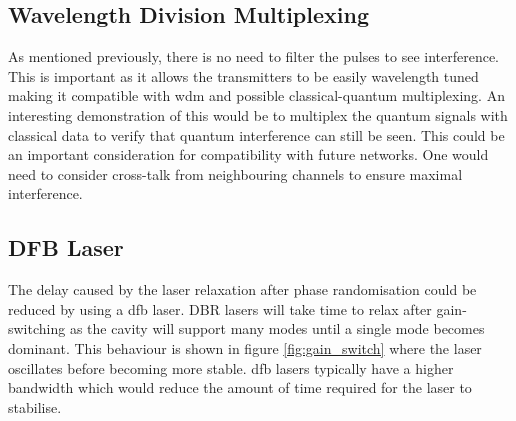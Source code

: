 \subsection{Wavelength Division Multiplexing}

As mentioned previously, there is no need to filter the pulses to see interference. This is important as it allows the transmitters to be easily wavelength tuned making it compatible with \ac{wdm} and possible classical-quantum multiplexing. An interesting demonstration of this would be to multiplex the quantum signals with classical data to verify that quantum interference can still be seen. This could be an important consideration for compatibility with future networks. One would need to consider cross-talk from neighbouring channels to ensure maximal interference.

\subsection{DFB Laser}

The delay caused by the laser relaxation after phase randomisation could be reduced by using a \ac{dfb} laser. \ac{DBR} lasers will take time to relax after gain-switching as the cavity will support many modes until a single mode becomes dominant. This behaviour is shown in figure \ref{fig:gain_switch} where the laser oscillates before becoming more stable. \Ac{dfb} lasers typically have a higher bandwidth which would reduce the amount of time required for the laser to stabilise.

